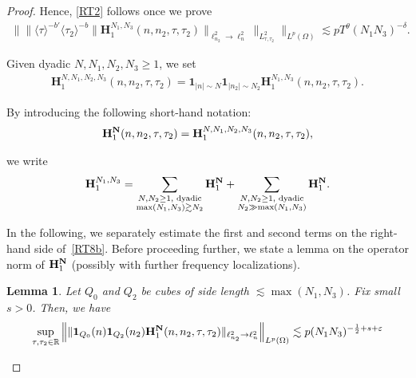 \documentclass[%
11pt,  reqno]{amsart}
\newtheorem{lemma}[theorem]{Lemma}
\newcommand{\1}{\hspace{0.2mm}\text{I}\hspace{0.2mm}}
\newcommand{\noi}{\noindent}
\newcommand{\R}{\mathbb{R}}
\newcommand{\dl}{\delta}
\newcommand{\eps}{\varepsilon}
\newcommand{\ta}{\theta}
\renewcommand{\l}{\ell}
\renewcommand{\O}{\Omega}
\newcommand{\les}{\lesssim}
\newcommand{\ges}{\gtrsim}
\newcommand{\jb}[1]
{\langle #1 \rangle}
\newcommand{\ind}{\mathbf 1}
\numberwithin{equation}{section}
\numberwithin{theorem}{section}
\newcommand{\Hb}{\mathbf{H}}
\begin{document}
\begin{proof}
\noi
Hence, \eqref{RT2} follows once we prove
\begin{align}
\Big\| \big\| \jb{\tau}^{-b'} \jb{\tau_2}^{-b} \| \Hb_1^{N_1, N_3}  (n,n_2,\tau, \tau_2) \|_{\l^2_{n_2} \to \l^2_n} \big\|_{L^2_{\tau, \tau_2}} \Big\|_{L^p (\O)} 
 \les p  T^\ta (N_1N_3)^{-\dl} .
\label{RT7}
\end{align}











Given dyadic $N, N_1, N_2, N_3 \ge 1$, we set 
\begin{align}
\Hb_1^{N, N_1, N_2,  N_3} (n,n_2,\tau, \tau_2)  
= \ind_{|n|\sim N} \ind_{|n_2|\sim N_2}
\Hb_1^{N_1, N_3} (n,n_2,\tau, \tau_2).
\label{RT8}
\end{align}

\noi
By introducing  the following short-hand notation:
\begin{align}
 \Hb_1^{{\bf N}} (n,n_2,\tau, \tau_2)  
= 
\Hb_1^{N, N_1, N_2,  N_3} (n,n_2,\tau, \tau_2) , 
\label{RT8a}
\end{align}



\noi
we write 
\begin{align}
\Hb_1^{N_1, N_3}
= 
\sum_{\substack{N, N_2 \ge 1, \text{ dyadic}\\ \max (N_1, N_3) \ges N_2}} 
\Hb_1^{\bf N}
+ 
\sum_{\substack{N, N_2 \ge 1, \text{ dyadic}\\ N_2 \gg \max (N_1, N_3)}} 
\Hb_1^{\bf N}.
\label{RT8b}
\end{align}


\noi
In the following, we separately estimate
the first and second terms on the right-hand side of~\eqref{RT8b}.
Before proceeding further, 
we state a lemma
on the operator norm
of 
$\Hb_1^{\bf N}$
(possibly with further frequency localizations).



\begin{lemma}
\label{LEM:RT1a} 
Let $Q_0$ and $Q_2$ be cubes of side length $\les \max(N_1,N_3)$.
Fix small  $s> 0$.
Then, we have 
\begin{align}
\sup_{\tau,\tau_2\in \R} \Big\| \| 
 \ind_{Q_0} (n) \ind_{Q_2} (n_2)
\Hb_1^{\bf N}
(n,n_2,\tau, \tau_2)
 \|_{\l^2_{n_2} \to \l^2_n} \Big\|_{L^p(\O)} 
\les p  (N_1N_3)^{- \frac 12 + s + \eps}
\label{RT9}
\end{align}


\end{lemma}
\end{proof}
\end{document}
